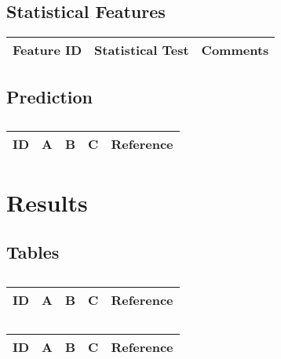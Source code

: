 \subsection{Statistical Features}

\begin{table}[H]\centering
	\begin{tabular}{p{1cm}p{4cm}p{3cm}}
		Feature ID & Statistical Test & Comments\\
		\hline
		\hline
	\end{tabular}
\end{table}

\subsection{Prediction}

\centering
\begin{table}[H]\footnotesize
	\caption{}
	\begin{tabular}{rp{1cm}p{2cm}p{3cm}p{1cm}}
		\hline
		ID & A & B & C & Reference \\
		\hline
		\hline
	\end{tabular}
\end{table}
\raggedright

\section{Results}

\begin{enumerate}
\end{enumerate}

\subsection{Tables}

\centering
\begin{table}[H]\footnotesize
	\caption{}
	\begin{tabular}{rp{1cm}p{2cm}p{3cm}p{1cm}}
		\hline
		ID & A & B & C & Reference \\
		\hline
		\hline
	\end{tabular}
\end{table}
\raggedright

\centering
\begin{table}[H]\footnotesize
	\caption{}
	\begin{tabular}{rp{1cm}p{2cm}p{3cm}p{1cm}}
		\hline
		ID & A & B & C & Reference \\
		\hline
		\hline
	\end{tabular}
\end{table}
\raggedright

